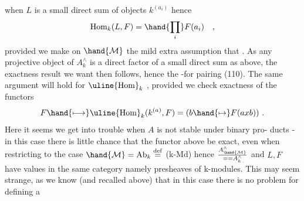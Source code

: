 when $L$ is a small direct sum of objects $k^{(a_i)}$ hence
\[\mathrm{Hom}_k(L,F) = \hand{\prod_{i}} F(a_i) \quad ,\]
provided we make on $\hand{\mathcal{M}}$ the mild extra assumption that \hand{\uline{\textcolor{black}{a small direct}}}
\hand{\uline{\textcolor{black}{product of epimorphisms is again an epimorphism}}}. As any projective
object of $A^{\wedge}_k$ is a direct factor of a small direct sum as above, the
exactness result we want then follows, hence the -for pairing
(110). The same argument will hold for $\uline{\mathrm{Hom}}_k$ , provided we check
exactness of the functors
\[F \hand{\longmapsto} \uline{\mathrm{Hom}}_k(k^{(a)},F) = (b \hand{\mapsto} F(axb)) \ .\]
Here it seems we get into trouble when $A$ is not stable under binary pro-%
ducts - in this case there is little chance that the functor above
be exact, even when restricting to the case $\hand{\mathcal{M}}= \mathrm{Ab}_k \overset{\mathrm{def}}{=}$ (k-Md)\hand{,} hence
$A^{\wedge}_{\hand{\mathcal{M}}} \over{=}{=} A^{\wedge}_k$  and $L,F$ have values in the same category \hand{(}namely
 presheaves of k-modules\hand{)}. This may seem strange, as we know (and
recalled above) that in this  case there is no problem for defining a


